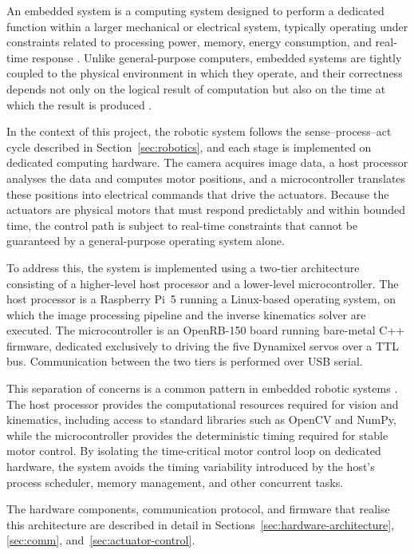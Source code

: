 
An embedded system is a computing system designed to perform a 
dedicated function within a larger mechanical or electrical system, 
typically operating under constraints related to processing power, 
memory, energy consumption, and real-time response \cite{marwedel2021}. 
Unlike general-purpose computers, embedded systems are tightly coupled 
to the physical environment in which they operate, and their correctness 
depends not only on the logical result of computation but also on the 
time at which the result is produced \cite{lee2017}.

In the context of this project, the robotic system follows the 
sense--process--act cycle described in Section~\ref{sec:robotics}, and each stage is 
implemented on dedicated computing hardware. The camera acquires image 
data, a host processor analyses the data and computes motor positions, 
and a microcontroller translates these positions into electrical 
commands that drive the actuators. Because the actuators are physical 
motors that must respond predictably and within bounded time, the 
control path is subject to real-time constraints that cannot be 
guaranteed by a general-purpose operating system alone.

To address this, the system is implemented using a two-tier 
architecture consisting of a higher-level host processor and a 
lower-level microcontroller. The host processor is a Raspberry Pi~5 
running a Linux-based operating system, on which the image processing 
pipeline and the inverse kinematics solver are executed. The 
microcontroller is an OpenRB-150 board running bare-metal C++ firmware, 
dedicated exclusively to driving the five Dynamixel servos over a TTL 
bus. Communication between the two tiers is performed over USB serial.

This separation of concerns is a common pattern in embedded robotic 
systems \cite{lee2017}. The host processor provides the computational 
resources required for vision and kinematics, including access to 
standard libraries such as OpenCV and NumPy, while the microcontroller 
provides the deterministic timing required for stable motor control. 
By isolating the time-critical motor control loop on dedicated hardware, 
the system avoids the timing variability introduced by the host's 
process scheduler, memory management, and other concurrent tasks.

The hardware components, communication protocol, and firmware that 
realise this architecture are described in detail in 
Sections~\ref{sec:hardware-architecture}, \ref{sec:comm}, 
and~\ref{sec:actuator-control}.
